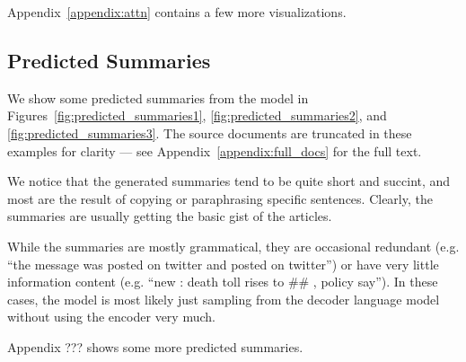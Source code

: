 \documentclass[12pt]{report}
\begin{document}
Appendix~\ref{appendix:attn} contains a few more visualizations.

\subsection{Predicted Summaries}
We show some predicted summaries from the model in Figures~\ref{fig:predicted_summaries1}, \ref{fig:predicted_summaries2}, and \ref{fig:predicted_summaries3}.
The source documents are truncated in these examples for clarity --- see Appendix~\ref{appendix:full_docs} for the full text.

We notice that the generated summaries tend to be quite short and succint, and most are the result of copying or paraphrasing specific sentences. Clearly, the summaries are usually getting the basic gist of the articles. 

While the summaries are mostly grammatical, they are occasional redundant (e.g. ``the message was posted on twitter and posted on twitter'') or have very little information content (e.g. ``new : death toll rises to \#\# , policy say''). In these cases, the model is most likely just sampling from the decoder language model without using the encoder very much.

Appendix ??? shows some more predicted summaries.
\end{document}
